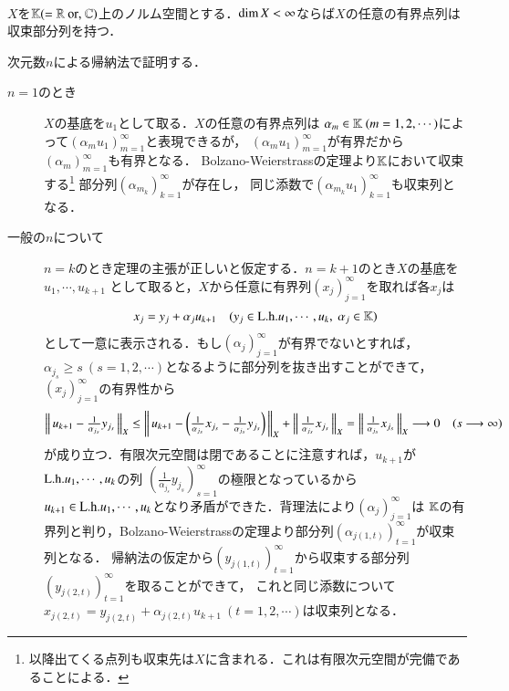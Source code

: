 \begin{itembox}[l]{}
	\begin{thm}\mbox{}\\
		$X$を$\K (=\R\ \mathrm{or, }\ \C)$上のノルム空間とする．$\operatorname{dim} X < \infty$ならば$X$の任意の有界点列は
		収束部分列を持つ．
	\end{thm}
\end{itembox}

\begin{prf}\mbox{}
	次元数$n$による帰納法で証明する．
	\begin{description}
		\item[$n=1$のとき]
			$X$の基底を$u_1$として取る．$X$の任意の有界点列は
			$\alpha_m \in \K\ (m=1,2,\cdots)$によって$( \alpha_m u_1)_{m=1}^{\infty}$と表現できるが，
			$\left( \alpha_mu_1 \right)_{m=1}^{\infty}$が有界だから$\left( \alpha_m \right)_{m=1}^{\infty}$も有界となる．
			Bolzano-Weierstrassの定理より$\mathbb{K}$において収束する\footnote{以降出てくる点列も収束先は$X$に含まれる．これは有限次元空間が完備であることによる．}
			部分列$\left( \alpha_{m_k} \right)_{k=1}^{\infty}$が存在し，
			同じ添数で$\left( \alpha_{m_k}u_1 \right)_{k=1}^{\infty}$も収束列となる．
		
		\item[一般の$n$について]
			$n=k$のとき定理の主張が正しいと仮定する．$n=k+1$のとき$X$の基底を$u_1,\cdots,u_{k+1}$
			として取ると，$X$から任意に有界列$(x_j)_{j=1}^{\infty}$を取れば各$x_j$は
			\begin{align}
				x_j = y_j + \alpha_j u_{k+1} \quad (y_j \in \mathrm{L.h.} u_1,\cdots,u_k,\ \alpha_j \in \mathbb{K})
			\end{align}
			として一意に表示される．もし$(\alpha_j)_{j=1}^{\infty}$が有界でないとすれば，
			$\alpha_{j_s} \geq s\ (s=1,2,\cdots)$となるように部分列を抜き出すことができて，$(x_j)_{j=1}^{\infty}$の有界性から
			\begin{align}
				\left\|\, u_{k+1} - \tfrac{1}{\alpha_{j_s}}y_{j_s}\, \right\|_{X}
				\leq \left\|\, u_{k+1} - \left(\tfrac{1}{\alpha_{j_s}}x_{j_s} - \tfrac{1}{\alpha_{j_s}}y_{j_s}\right)\, \right\|_{X}
					+ \left\|\, \tfrac{1}{\alpha_{j_s}}x_{j_s}\, \right\|_{X}
				= \left\|\, \tfrac{1}{\alpha_{j_s}}x_{j_s}\, \right\|_{X} \longrightarrow 0 \quad (s \longrightarrow \infty)
			\end{align}
			が成り立つ．有限次元空間は閉であることに注意すれば，$u_{k+1}$が$\mathrm{L.h.} u_1,\cdots,u_k$の列
			$\left(\tfrac{1}{\alpha_{j_s}}y_{j_s}\right)_{s=1}^{\infty}$の極限となっているから
			$u_{k+1} \in \mathrm{L.h.} u_1,\cdots,u_k$となり矛盾ができた．背理法により$(\alpha_j)_{j=1}^{\infty}$は
			$\mathbb{K}$の有界列と判り，Bolzano-Weierstrassの定理より部分列$(\alpha_{j(1,t)})_{t=1}^{\infty}$が収束列となる．
			帰納法の仮定から$(y_{j(1,t)})_{t=1}^{\infty}$から収束する部分列$(y_{j(2,t)})_{t=1}^{\infty}$を取ることができて，
			これと同じ添数について$x_{j(2,t)} = y_{j(2,t)} + \alpha_{j(2,t)}u_{k+1}\ (t=1,2,\cdots)$は収束列となる．
	\end{description}
	\QED
\end{prf}